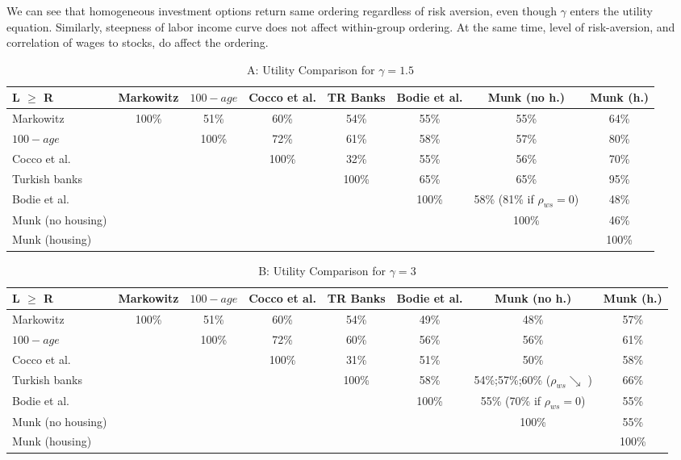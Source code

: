 \documentclass[]{elsarticle}
\begin{document}
We can see that homogeneous investment options return same ordering regardless of risk aversion, even though $\gamma$ enters the utility equation. Similarly, steepness of labor income curve does not affect within-group ordering. At the same time, level of risk-aversion, and correlation of wages to stocks, do affect the ordering.


\begin{table}[h!]
	\centering
	\caption{A: Utility Comparison for $\gamma=1.5$}
	\label{table:compareutils}
	\begin{tabular}[c]{|l|ccccccc|}
		\hline
		L $\geq$ R			&Markowitz&$100-age$&Cocco et al.&TR Banks&Bodie et al.&Munk (no h.)&Munk (h.)\\
		\hline
Markowitz					&100\%&51\%&60\%&54\%&55\%&55\%&64\%\\
$100-age$					&&100\%&72\%&61\%&58\%&57\%&80\%\\
Cocco et al.				&&&100\%&32\%&55\%&56\%&70\%\\
Turkish banks			 	&&&&100\%&65\%&65\%&95\%\\
Bodie et al.			 	&&&&&100\%&58\% (81\% if $\rho_{ws}=0$)&48\%\\
Munk (no housing)			&&&&&&100\%&46\%\\
Munk (housing)				&&&&&&&100\%\\
	\hline
	\end{tabular}
\end{table}
\begin{table}[h!]\ContinuedFloat
	\centering
	\caption{B: Utility Comparison for $\gamma=3$}
	\label{table:compareutils}
	\begin{tabular}[c]{|l|ccccccc|}
		\hline
		L $\geq$ R			&Markowitz&$100-age$&Cocco et al.&TR Banks&Bodie et al.&Munk (no h.)&Munk (h.)\\
		\hline
Markowitz					&100\%&51\%&60\%&54\%&49\%&48\%&57\%\\
$100-age$					&&100\%&72\%&60\%&56\%&56\%&61\%\\
Cocco et al.				&&&100\%&31\%&51\%&50\%&58\%\\
Turkish banks			 	&&&&100\%&58\%&54\%;57\%;60\% ($\rho_{ws} \searrow$ )&66\%\\
Bodie et al.			 	&&&&&100\%&55\% (70\% if $\rho_{ws}=0$)&55\%\\
Munk (no housing)			&&&&&&100\%&55\%\\
Munk (housing)				&&&&&&&100\%\\
	\hline
	\end{tabular}
\end{table}
\end{document}

